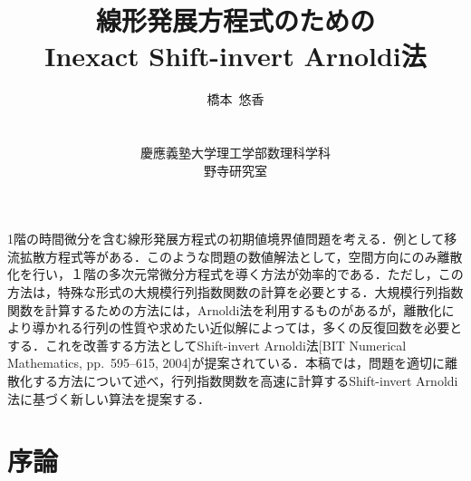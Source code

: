 \documentclass[a4paper,12pt]{nodlabpabw}
\begin{document}
\title{線形発展方程式のための\\Inexact Shift-invert Arnoldi法}
\author{橋本\ 悠香\\\\\\慶應義塾大学理工学部数理科学科\\野寺研究室}
\date{}
\maketitle
\begin{tableofcontents}
\end{tableofcontents}
\abstract
1階の時間微分を含む線形発展方程式の初期値境界値問題を考える．例として移流拡散方程式等がある．このような問題の数値解法として，空間方向にのみ離散化を行い，１階の多次元常微分方程式を導く方法が効率的である．ただし，この方法は，特殊な形式の大規模行列指数関数の計算を必要とする．大規模行列指数関数を計算するための方法には，Arnoldi法を利用するものがあるが，離散化により導かれる行列の性質や求めたい近似解によっては，多くの反復回数を必要とする．これを改善する方法としてShift-invert Arnoldi法[BIT Numerical Mathematics, pp.\ 595--615, 2004]が提案されている．本稿では，問題を適切に離散化する方法について述べ，行列指数関数を高速に計算するShift-invert Arnoldi法に基づく新しい算法を提案する．
\endabstract
%
\chapter{序論}
\end{document}
